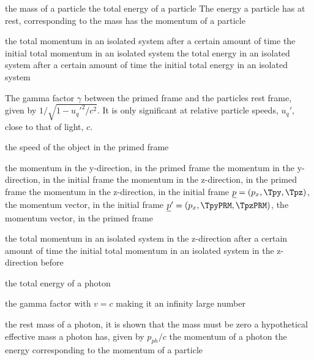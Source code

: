 {the mass of a particle}
{the total energy of a particle}
{The energy a particle has at rest, corresponding to the mass has}
{the momentum of a particle}

{the total momentum in an isolated system after a certain amount of time}
{the initial total momentum in an isolated system}
{the total energy in an isolated system after a certain amount of time}
{the initial total energy in an isolated system}



{The gamma factor $\gamma$ between the primed frame and the particles rest frame, given by ${1/\sqrt{1-u_q'^2/c^2}}$. It is only significant at relative particle speeds, $u_q'$, close to that of light, $c$.}

{the speed of the object in the primed frame}

{the momentum in the y-direction, in the primed frame}
{the momentum in the y-direction, in the initial frame}
{the momentum in the z-direction, in the primed frame}
{the momentum in the z-direction, in the initial frame}
{$\underline{p}=(p_x,\Tpy,\Tpz)$, the momentum vector, in the initial frame}
{$\underline{p}'=(p_x,\TpyPRM,\TpzPRM)$, the momentum vector, in the primed frame}

{the total momentum in an isolated system in the z-direction after a certain amount of time}
{the initial total momentum in an isolated system in the z-direction before}


{the total energy of a photon}

{the gamma factor with $v=c$ making it an infinity large number}

{the rest mass of a photon, it is shown that the mass must be zero}
{a hypothetical effective mass a photon has, given by $p_{ph}/c$ }
{the momentum of a photon}
{the energy corresponding to the momentum of a particle}



